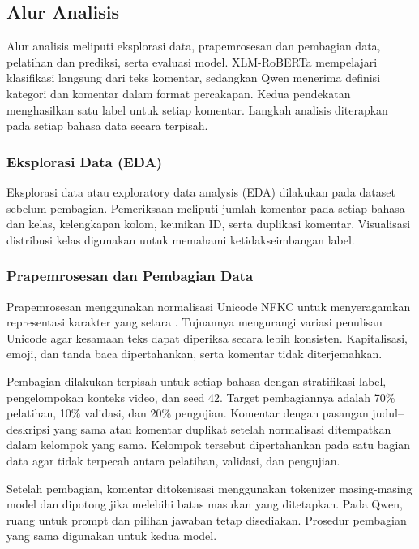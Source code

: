 \documentclass[11pt]{article}
\begin{document}
\subsection{Alur Analisis}
Alur analisis meliputi eksplorasi data, prapemrosesan dan pembagian data, pelatihan dan prediksi, serta evaluasi model. XLM-RoBERTa mempelajari klasifikasi langsung dari teks komentar, sedangkan Qwen menerima definisi kategori dan komentar dalam format percakapan. Kedua pendekatan menghasilkan satu label untuk setiap komentar. Langkah analisis diterapkan pada setiap bahasa data secara terpisah.

\subsubsection{Eksplorasi Data (EDA)}
Eksplorasi data atau exploratory data analysis (EDA) dilakukan pada dataset sebelum pembagian. Pemeriksaan meliputi jumlah komentar pada setiap bahasa dan kelas, kelengkapan kolom, keunikan ID, serta duplikasi komentar. Visualisasi distribusi kelas digunakan untuk memahami ketidakseimbangan label.

\subsubsection{Prapemrosesan dan Pembagian Data}
Prapemrosesan menggunakan normalisasi Unicode NFKC untuk menyeragamkan representasi karakter yang setara \citep{unicode-consortium-2026-normalization}. Tujuannya mengurangi variasi penulisan Unicode agar kesamaan teks dapat diperiksa secara lebih konsisten. Kapitalisasi, emoji, dan tanda baca dipertahankan, serta komentar tidak diterjemahkan.

Pembagian dilakukan terpisah untuk setiap bahasa dengan stratifikasi label, pengelompokan konteks video, dan seed 42. Target pembagiannya adalah 70\% pelatihan, 10\% validasi, dan 20\% pengujian. Komentar dengan pasangan judul--deskripsi yang sama atau komentar duplikat setelah normalisasi ditempatkan dalam kelompok yang sama. Kelompok tersebut dipertahankan pada satu bagian data agar tidak terpecah antara pelatihan, validasi, dan pengujian.

Setelah pembagian, komentar ditokenisasi menggunakan tokenizer masing-masing model dan dipotong jika melebihi batas masukan yang ditetapkan. Pada Qwen, ruang untuk prompt dan pilihan jawaban tetap disediakan. Prosedur pembagian yang sama digunakan untuk kedua model.
\end{document}
